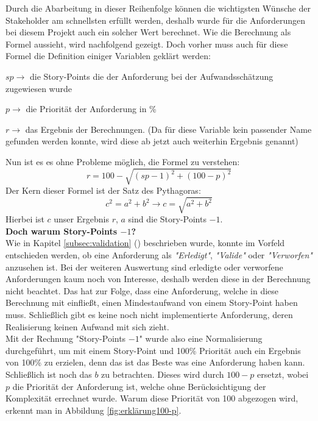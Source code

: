 Durch die Abarbeitung in dieser Reihenfolge können die wichtigsten Wünsche der Stakeholder am schnellsten erfüllt werden, deshalb wurde für die Anforderungen bei diesem Projekt auch ein solcher Wert berechnet. Wie die Berechnung als Formel aussieht, wird nachfolgend gezeigt. Doch vorher muss auch für diese Formel die Definition einiger Variablen geklärt werden:

\begin{description}
\item $ sp \rightarrow$ die Story-Points die der Anforderung bei der Aufwandsschätzung zugewiesen wurde
\item $ p \rightarrow$ die Priorität der Anforderung in \%
\item $ r \rightarrow$ das Ergebnis der Berechnungen. (Da für diese Variable kein passender Name gefunden werden konnte, wird diese ab jetzt auch weiterhin Ergebnis genannt)
\end{description}

Nun ist es es ohne Probleme möglich, die Formel zu verstehen:
$$r = 100-\sqrt{(sp-1)^{2}+(100-p)^{2}}$$
Der Kern dieser Formel ist der Satz des Pythagoras:
$$c^{2} = a^{2}+ b^{2} \rightarrow c = \sqrt{a^{2}+ b^{2}}$$
Hierbei ist $c$ unser Ergebnis $r$, $a$ sind die Story-Points $- 1$. \\

\textbf{Doch warum Story-Points $- 1$?}\\
Wie in Kapitel \ref{subsec:validation} () beschrieben wurde, konnte im Vorfeld entschieden werden, ob eine Anforderung als \textit{"Erledigt"}, \textit{"Valide"} oder \textit{"Verworfen"} anzusehen ist. Bei der weiteren Auswertung sind erledigte oder verworfene Anforderungen kaum noch von Interesse, deshalb werden diese in der Berechnung nicht beachtet. Das hat zur Folge, dass eine Anforderung, welche in diese Berechnung mit einfließt, einen Mindestaufwand von einem Story-Point haben muss. Schließlich gibt es keine noch nicht implementierte Anforderung, deren Realisierung keinen Aufwand mit sich zieht.\\

Mit der Rechnung "Story-Points $- 1$" wurde also eine Normalisierung durchgeführt, um mit einem Story-Point und 100\% Priorität auch ein Ergebnis von 100\% zu erzielen, denn das ist das Beste was eine Anforderung haben kann. \\

Schließlich ist noch das $b$ zu betrachten. Dieses wird durch $100-p$ ersetzt, wobei $p$ die Priorität der Anforderung ist, welche ohne Berücksichtigung der Komplexität errechnet wurde. Warum diese Priorität von 100 abgezogen wird, erkennt man in Abbildung \ref{fig:erklärung100-p}.


